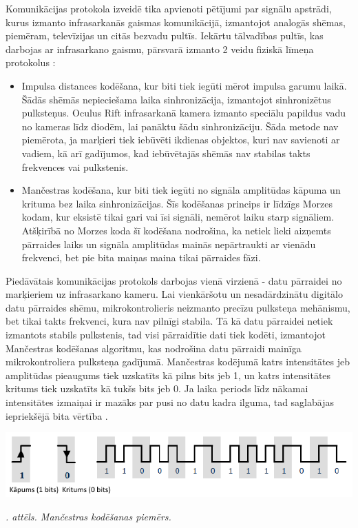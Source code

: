 \documentclass[12pt, a4paper, oneside, openright]{article}
\renewcommand{\thecimages}{\arabic{cimages}}
\begin{document}
\par
Komunikācijas protokola izveidē tika apvienoti pētījumi par signālu apstrādi, kurus izmanto infrasarkanās
gaismas komunikācijā, izmantojot analogās shēmas, piemēram, televīzijas un citās bezvadu pultīs.
Iekārtu tālvadības pultīs, kas darbojas ar infrasarkano gaismu, pārsvarā izmanto 2 veidu fiziskā līmeņa protokolus \cite{ThibautRaharijaona2010}:
\begin{itemize}
\item Impulsa distances kodēšana, kur biti tiek iegūti mērot impulsa garumu laikā. Šādās shēmās nepieciešama laika
sinhronizācija, izmantojot sinhronizētus pulksteņus. Oculus Rift infrasarkanā kamera izmanto speciālu papildus
vadu no kameras līdz diodēm, lai panāktu šādu sinhronizāciju. Šāda metode nav piemērota, ja marķieri 
tiek iebūvēti ikdienas objektos, kuri nav savienoti ar vadiem, kā arī gadījumos, kad iebūvētajās shēmās
nav stabilas takts frekvences vai pulkstenis.
\item Mančestras kodēšana, kur biti tiek iegūti no signāla amplitūdas kāpuma un krituma bez laika sinhronizācijas.
Šīs kodēšanas princips ir līdzīgs Morzes kodam, kur eksistē tikai gari vai īsi signāli, nemērot laiku starp signāliem.
Atšķirībā no Morzes koda šī kodēšana nodrošina, ka netiek lieki aizņemts pārraides laiks un signāla amplitūdas 
mainās nepārtraukti ar vienādu frekvenci, bet pie bita maiņas maina tikai pārraides fāzi.
\end{itemize}


\par
Piedāvātais komunikācijas protokols darbojas vienā virzienā - datu pārraidei no \\ marķieriem uz infrasarkano
kameru. Lai vienkāršotu un nesadārdzinātu digitālo datu pārraides shēmu, mikrokontrolieris neizmanto precīzu pulksteņa mehānismu,
bet tikai takts frekvenci, kura nav pilnīgi stabila.
Tā kā datu pārraidei netiek izmantots stabils pulkstenis, tad visi pārraidītie dati tiek kodēti,
izmantojot Mančestras kodēšanas algoritmu, kas nodrošina datu pārraidi mainīga mikrokontroliera pulksteņa
gadījumā. Mančestras kodējumā katrs intensitātes jeb amplitūdas pieaugums tiek uzskatīts kā pilns bits
jeb 1, un katrs intensitātes kritums tiek uzskatīts kā tukšs bits jeb 0. Ja laika periods līdz
nākamai intensitātes izmaiņai ir mazāks par pusi no datu kadra ilguma, tad saglabājas iepriekšējā
bita vērtība \cite{ThibautRaharijaona2010}.

\label{cimages:ThibautRaharijaona2010_1.png}
\vspace{10pt}
\begin{samepage}
\begin{center}
\includegraphics[width=0.8\columnwidth]{images/ThibautRaharijaona2010_1.png}
\begin{center}
\footnotesize{
\textit{\thecimages. attēls. Mančestras kodēšanas piemērs.}}
\end{center}
\end{center}
\end{samepage}
\end{document}
